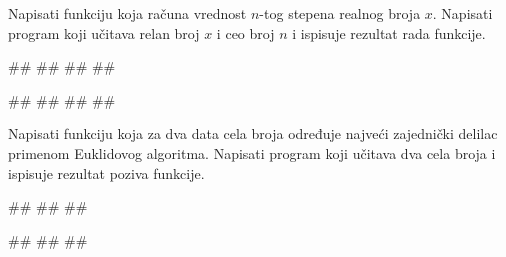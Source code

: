 \begin{Exercise}[label=v1.4_02] 
Napisati funkciju  koja računa
vrednost $n$-tog stepena realnog broja $x$. Napisati program koji
učitava relan broj $x$ i ceo broj $n$ i ispisuje rezultat rada
funkcije.

\begin{miditest}
\begin{upotreba}{1}
#\naslovInt#
##
##
##
\end{upotreba}
\end{miditest}
\begin{miditest}
\begin{upotreba}{2}
#\naslovInt#
##
##
##
\end{upotreba}
\end{miditest}


\end{Exercise}
\begin{Answer}[ref=v1.4_02]
\end{Answer}

\begin{Exercise}[label=v1.4_03] 
Napisati funkciju  koja za dva data
cela broja određuje najveći zajednički delilac primenom Euklidovog
algoritma. Napisati program koji učitava dva cela broja i ispisuje
rezultat poziva funkcije.

\begin{miditest}
\begin{upotreba}{1}
#\naslovInt#
##
##
\end{upotreba}
\end{miditest}
\begin{miditest}
\begin{upotreba}{2}
#\naslovInt#
##
##
\end{upotreba}
\end{miditest}


\end{Exercise}
\begin{Answer}[ref=v1.4_03]
\end{Answer}

